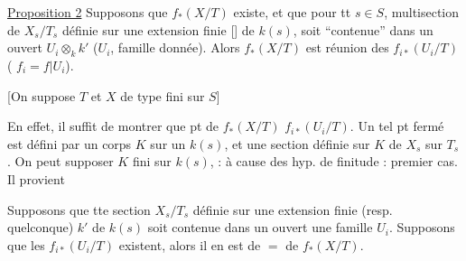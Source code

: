 



\uline{Proposition 2} Supposons que $f_*(X/T)$ existe, et que pour tt $s\in S$,  multisection de $X_s/T_s$ définie sur une extension finie  [] de $k(s)$, soit ``contenue'' dans un ouvert   $U_i\otimes_k k'$ ($U_i$, famille donnée). Alors $f_*(X/T)$ est réunion des $f_{i*}(U_i/T)$ ( $f_i=f\vert U_i$).


[On suppose $T$ et $X$ de type fini sur $S$]

En effet,  il suffit de montrer que  pt  de $f_*(X/T)$    $f_{i*}(U_i/T)$. Un tel pt fermé est défini par un corps $K$ sur un $k(s)$, et une section définie sur $K$ de $X_s$ sur $T_s$. On peut  supposer  $K$ fini sur $k(s)$, : à cause des hyp. de finitude  :  premier cas. Il provient 


 Supposons que tte section $X_s/T_s$ définie sur une extension finie (resp. quelconque) $k'$ de $k(s)$ soit contenue dans un ouvert  une famille $U_i$. Supposons que les $f_{i*}(U_i/T)$ existent, alors il en est de $=$ de $f_*(X/T)$.

